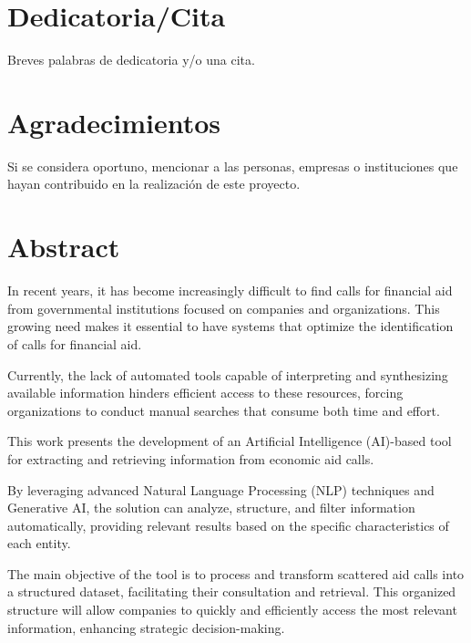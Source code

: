 \chapter*{Dedicatoria/Cita}

Breves palabras de dedicatoria y/o una cita.

\chapter*{Agradecimientos}

Si se considera oportuno, mencionar a las personas, empresas o instituciones que hayan contribuido en la realización de este proyecto.

\chapter*{Abstract}

\onehalfspacing

In recent years, it has become increasingly difficult to find calls for financial aid from governmental institutions focused on companies and organizations. This growing need makes it essential to have systems that optimize the identification of calls for financial aid. 

Currently, the lack of automated tools capable of interpreting and synthesizing available information hinders efficient access to these resources, forcing organizations to conduct manual searches that consume both time and effort.

This work presents the development of an Artificial Intelligence (AI)-based tool for extracting and retrieving information from economic aid calls.

By leveraging advanced Natural Language Processing (NLP) techniques and Generative AI, the solution can analyze, structure, and filter information automatically, providing relevant results based on the specific characteristics of each entity.

The main objective of the tool is to process and transform scattered aid calls into a structured dataset, facilitating their consultation and retrieval. This organized structure will allow companies to quickly and efficiently access the most relevant information, enhancing strategic decision-making.

